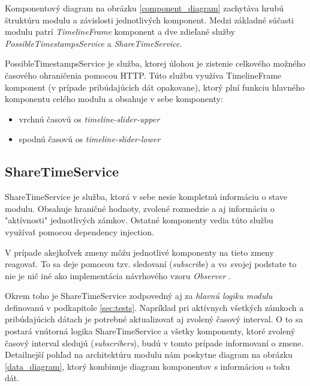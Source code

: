 \documentclass[
  printed, %
  twoside, %
  notable,   %
  nolof,   %
  nolot,   %
]{fithesis3}
\newcommand{\inquotes}[1]{{}"{}#1{}"{}}
\begin{document}
Komponentový diagram na obrázku \ref{component_diagram} zachytáva hrubú štruktúru modulu a závislosti jednotlivých komponent. Medzi základné súčasti modulu patrí \textit{TimelineFrame} komponent a dve zdieľané služby \textit{PossibleTimestampsService} a \textit{ShareTimeService}.

PossibleTimestampsService je služba, ktorej úlohou je zistenie celkového možného časového ohraničenia pomocou HTTP. Túto službu využíva TimelineFrame komponent (v prípade pribúdajúcich dát opakovane), ktorý plní funkciu hlavného komponentu celého modulu a obsahuje v sebe komponenty:
\begin{itemize}
\item vrchnú časovú os \textit{timeline-slider-upper}
\item spodnú časovú os \textit{timeline-slider-lower}
\end{itemize}

\subsection{ShareTimeService}
ShareTimeService je služba, ktorá v sebe nesie kompletnú informáciu o stave modulu. Obsahuje hraničné hodnoty, zvolené rozmedzie a aj informáciu o \inquotes{aktívnosti} jednotlivých zámkov. Ostatné komponenty vedia túto službu využívať pomocou dependency injection.

V prípade akejkoľvek zmeny môžu jednotlivé komponenty na tieto zmeny reagovať. To sa deje pomocou tzv. sledovaní (\textit{subscribe}) a vo~svojej podstate to nie je nič iné ako implementácia návrhového vzoru \textit{Observer} \cite{rhrjjv1994elements}.

Okrem toho je ShareTimeService zodpovedný aj za \textit{hlavnú logiku modulu} definovanú v podkapitole \ref{sec:tests}. Napríklad pri aktívnych všetkých zámkoch a pribúdajúcich dátach je potrebné aktualizovať aj zvolený časový interval. O to sa postará vnútorná logika ShareTimeService a všetky komponenty, ktoré zvolený časový interval sledujú (\textit{subscribers}), budú v tomto prípade informovaní o zmene. Detailnejší pohľad na architektúru modulu nám poskytne diagram na obrázku \ref{data_diagram}, ktorý kombinuje diagram komponentov s informáciou o toku dát.
\clearpage
\end{document}
